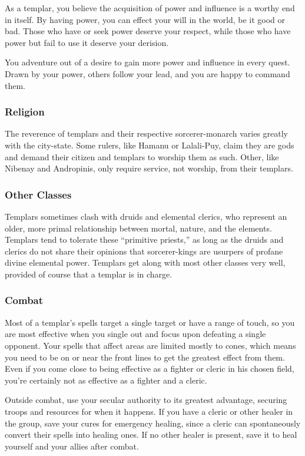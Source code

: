 As a templar, you believe the acquisition of power and influence is a worthy end in itself. By having power, you can effect your will in the world, be it good or bad. Those who have or seek power deserve your respect, while those who have power but fail to use it deserve your derision.

You adventure out of a desire to gain more power and influence in every quest. Drawn by your power, others follow your lead, and you are happy to command them.

\subsubsection{Religion}
The reverence of templars and their respective sorcerer-monarch varies greatly with the city-state. Some rulers, like Hamanu or Lalali-Puy, claim they are gods and demand their citizen and templars to worship them as such. Other, like Nibenay and Andropinis, only require service, not worship, from their templars.

\subsubsection{Other Classes}
Templars sometimes clash with druids and elemental clerics, who represent an older, more primal relationship between mortal, nature, and the elements. Templars tend to tolerate these ``primitive priests,'' as long as the druids and clerics do not share their opinions that sorcerer-kings are usurpers of profane divine elemental power. Templars get along with most other classes very well, provided of course that a templar is in charge.

\subsubsection{Combat}
Most of a templar's spells target a single target or have a range of touch, so you are most effective when you single out and focus upon defeating a single opponent. Your spells that affect areas are limited mostly to cones,
which means you need to be on or near the front lines to get the greatest effect from them. Even if you come close to being effective as a fighter or cleric in his chosen field, you're certainly not as effective as a fighter and a cleric.

Outside combat, use your secular authority to its greatest advantage, securing troops and resources for when it happens. If you have a cleric or other healer in the group, save your cures for emergency healing, since a cleric can spontaneously convert their spells into healing ones. If no other healer is present, save it to heal yourself and your allies after combat.

